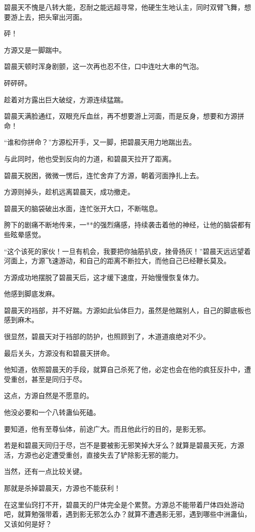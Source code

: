 \begin{this_body}
碧晨天不愧是八转大能，忍耐之能远超寻常，他硬生生地认主，同时双臂飞舞，想要游上去，把头窜出河面。

砰！

方源又是一脚踹中。

碧晨天顿时浑身剧颤，这一次再也忍不住，口中连吐大串的气泡。

砰砰砰。

趁着对方露出巨大破绽，方源连续猛踹。

碧晨天满脸通红，双眼充斥血丝，再不想要游上河面，而是反身，想要和方源拼命！

“谁和你拼命？”方源松开手，又一脚，把碧晨天用力地踹出去。

与此同时，他也受到反向的力道，和碧晨天拉开了距离。

碧晨天脱困，微微一愣后，连忙舍弃了方源，朝着河面挣扎上去。

方源则掉头，趁机远离碧晨天，成功撤走。

碧晨天的脑袋破出水面，连忙张开大口，不断喘息。

胯下的剧痛不断地传来，一**的强烈痛感，持续袭击着他的神经，让他的脑袋都有些眩晕感觉。

“这个该死的家伙！一旦有机会，我要把你抽筋扒皮，挫骨扬灰！”碧晨天远远望着河面上，方源飞速游动，和自己的距离不断拉大，而他自己已经鞭长莫及。

方源成功地摆脱了碧晨天后，这才缓下速度，开始慢慢恢复体力。

他感到脚底发麻。

碧晨天的裆部，并不好踹。方源如此仙体巨力，虽然是他踹别人，自己的脚底板也感到麻木。

很显然，碧晨天对于裆部的防护，也照顾到了，木道道痕绝对不少。

最后关头，方源没有和碧晨天拼命。

他知道，依照碧晨天的手段，就算自己杀死了他，必定也会在他的疯狂反扑中，遭受重创，甚至是同归于尽。

这点，方源自然是不愿意的。

他没必要和一个八转蛊仙死磕。

要知道，他有至尊仙体，前途广大。而且他此行的目的，是影无邪。

若是和碧晨天同归于尽，岂不是要被影无邪笑掉大牙么？就算是碧晨天死，方源活，方源也必定遭受重创，直接失去了铲除影无邪的能力。

当然，还有一点比较关键。

那就是杀掉碧晨天，方源也不能获利！

在这里仙窍打不开，碧晨天的尸体完全是个累赘。方源总不能带着尸体四处游动吧，就算勉强带着，遇到影无邪怎么办？就算不遭遇影无邪，遇到哪些中洲蛊仙，又该如何是好？


\end{this_body}
